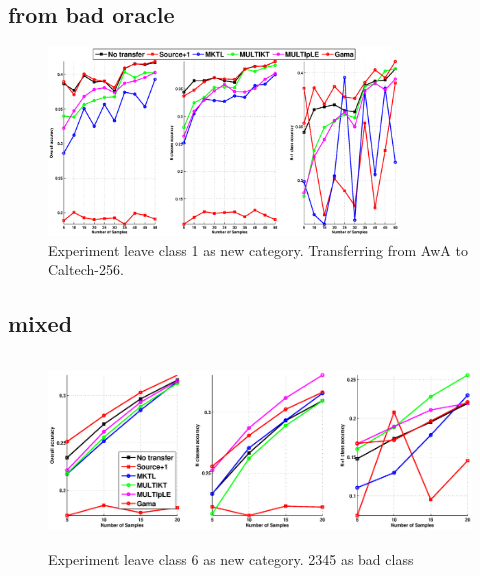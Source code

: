 \subsection{from bad oracle}
\begin{figure}
\includegraphics[width=\textwidth,height=5cm]{fig/A2C_RBF_PHOG.eps}
\caption{Experiment leave class 1 as new category. Transferring from AwA to Caltech-256.}
\end{figure}

\subsection{mixed}
\begin{figure}
\includegraphics[width=\textwidth,height=5cm]{fig/A2A_MIX_L6_2345.eps}
\caption{Experiment leave class 6 as new category. 2345 as bad class}
\end{figure}
